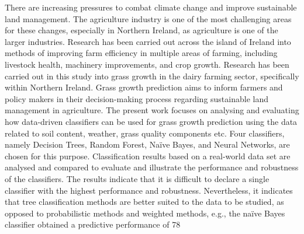 There are increasing pressures to combat climate change and improve sustainable land management. The agriculture industry is one of the most challenging areas for these changes, especially in Northern Ireland, as agriculture is one of the larger industries. Research has been carried out across the island of Ireland into methods of improving farm efficiency in multiple areas of farming, including livestock health, machinery improvements, and crop growth. Research has been carried out in this study into grass growth in the dairy farming sector, specifically within Northern Ireland. Grass growth prediction aims to inform farmers and policy makers in their decision-making process regarding sustainable land management in agriculture. The present work focuses on analysing and evaluating how data-driven classifiers can be used for grass growth prediction using the data related to soil content, weather, grass quality components etc. Four classifiers, namely Decision Trees, Random Forest, Naïve Bayes, and Neural Networks, are chosen for this purpose. Classification results based on a real-world data set are analysed and compared to evaluate and illustrate the performance and robustness of the classifiers. The results indicate that it is difficult to declare a single classifier with the highest performance and robustness. Nevertheless, it indicates that tree classification methods are better suited to the data to be studied, as opposed to probabilistic methods and weighted methods, e.g., the naïve Bayes classifier obtained a predictive performance of 78%
